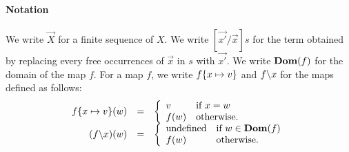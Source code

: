 
\paragraph{Notation} We write \(\vec{X}\) for a finite sequence of
\(X\).  We write \([\vec{x'}/\vec{x}]s\) for the term obtained by
replacing every free occurrences of \(\vec{x}\) in \(s\) with
\(\vec{x'}\).  We write \(\mathbf{Dom}(f)\) for the domain of the map \(f\).  For a
map \(f\), we write \(f \{x \mapsto v\}\) and \(f \backslash x\) for the
maps defined as follows:
\[
\begin{array}{rcl}
f \{x \mapsto v\} (w) &=&
\left\{
\begin{array}{ll}
v & \mbox{if \(x = w\)}\\
f(w) & \mbox{otherwise.}
\end{array}
\right.\\
(f \backslash x)(w) &=&
\left\{
\begin{array}{ll}
\mbox{undefined} & \mbox{if \(w \in \mathbf{Dom}(f)\)}\\
f(w) & \mbox{otherwise.}
\end{array}
\right.
\end{array}
\]
